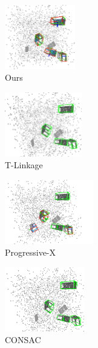\begin{figure}[ht]
      
          \begin{subfigure}{0.18\textwidth}
            \centering
            \includegraphics[height=2.8cm]{images/multi-ours.png}
              \caption{Ours}
              \label{fig:multi-result}
          \end{subfigure}
          \begin{subfigure}{0.18\textwidth}
            \centering
            \includegraphics[height=2.8cm]{images/multi-tlinkage.png}
              \caption{T-Linkage\cite{magri2014t}}
              \label{fig:multi-tlinkage1}
          \end{subfigure}
          \begin{subfigure}{0.2\textwidth}
            \centering
            \includegraphics[height=2.8cm]{images/multi-progx.png}
              \caption{Progressive-X\cite{zhao2021progressive}}
              \label{fig:multi-prox}
          \end{subfigure}
          \begin{subfigure}{0.2\textwidth}
            \centering
            \includegraphics[height=2.8cm]{images/multi-consac.png}
              \caption{CONSAC\cite{kluger2020consac}}
              \label{fig:multi-consac}
          \end{subfigure}
          \begin{subfigure}{0.18\textwidth}

\end{subfigure}
\end{figure}
